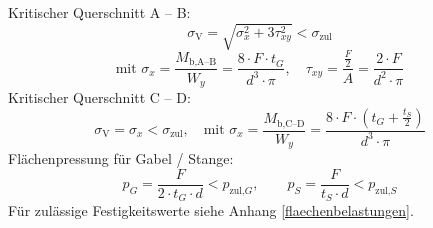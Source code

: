 		Kritischer Querschnitt A -- B:
		\begin{equation*}
			\sigma_{\text{V}} = \sqrt{\sigma_x^2 + 3 \tau_{xy}^2} < \sigma_{\text{zul}}
		\end{equation*}
		\begin{equation*}
			\text{mit } \sigma_x = \frac{M_{\text{b,A--B}}}{W_y}= \frac{8 \cdot F \cdot t_G}{d^3 \cdot \pi}, \quad \tau_{xy}= \frac{\frac{F}{2}}{A}= \frac{2 \cdot F}{d^2 \cdot \pi}
		\end{equation*}
		Kritischer Querschnitt C -- D:
		\begin{equation*}
			\sigma_{\text{V}} = \sigma_x < \sigma_{\text{zul}}, \quad \text{mit } \sigma_x = \frac{M_{\text{b,C--D}}}{W_y}=\frac{8 \cdot F \cdot \left(t_G + \frac{t_S}{2}\right)}{d^3 \cdot \pi}
		\end{equation*}
		Flächenpressung für Gabel / Stange:
		\begin{equation*}
			p_G = \frac{F}{2 \cdot t_G \cdot d} < p_{\text{zul,}G}, \qquad p_S = \frac{F}{t_S \cdot d} < p_{\text{zul,}S}
		\end{equation*}
		Für zulässige Festigkeitswerte siehe Anhang \ref{flaechenbelastungen}.
